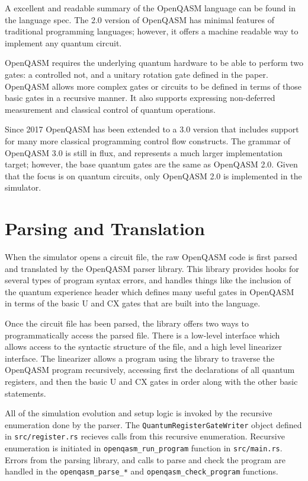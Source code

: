 \documentclass[%
 reprint,
 amsmath,amssymb,
 aps,
]{revtex4-2}
\begin{document}
A excellent and readable summary of the OpenQASM language can be found in the language spec\cite{crossOpen2017}. The 2.0 version of OpenQASM has minimal features of traditional programming languages; however, it offers a machine readable way to implement any quantum circuit. 

OpenQASM requires the underlying quantum hardware to be able to perform two gates: a controlled not, and a unitary rotation gate defined in the paper. OpenQASM allows more complex gates or circuits to be defined in terms of those basic gates in a recursive manner. It also supports expressing non-deferred measurement and classical control of quantum operations. 

Since 2017 OpenQASM has been extended to a 3.0 version that includes support for many more classical programming control flow constructs. The grammar of OpenQASM 3.0 is still in flux, and represents a much larger implementation target; however, the base quantum gates are the same as OpenQASM 2.0\cite{crossOpenQASM}. Given that the focus is on quantum circuits, only OpenQASM 2.0 is implemented in the simulator.

\section{\label{sec:level1} \label{parse} Parsing and Translation}
When the simulator opens a circuit file, the raw OpenQASM code is first parsed and translated by the OpenQASM parser library. This library provides hooks for several types of program syntax errors, and handles things like the inclusion of the quantum experience header which defines many useful gates in OpenQASM in terms of the basic U and CX gates that are built into the language. 

Once the circuit file has been parsed, the library offers two ways to programmatically access the parsed file. There is a low-level interface which allows access to the syntactic structure of the file, and a high level linearizer interface. The linearizer allows a program using the library to traverse the OpenQASM program recursively, accessing first the declarations of all quantum registers, and then the basic U and CX gates in order along with the other basic statements.

All of the simulation evolution and setup logic is invoked by the recursive enumeration done by the parser. The \texttt{QuantumRegisterGateWriter} object defined in \texttt{src/register.rs} recieves calls from this recursive enumeration. Recursive enumeration is initiated in \texttt{openqasm\_run\_program} function in \texttt{src/main.rs}. Errors from the parsing library, and calls to parse and check the program are handled in the \texttt{openqasm\_parse\_*} and \texttt{openqasm\_check\_program} functions.
\end{document}
